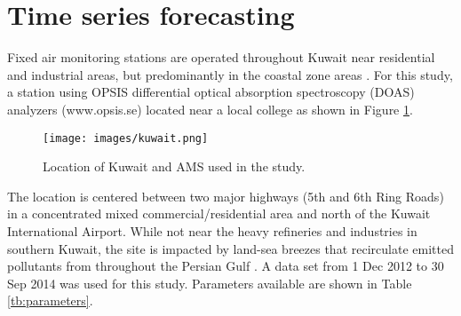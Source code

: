 \clearpage

\section{Time series forecasting}

Fixed air monitoring stations are operated throughout Kuwait near residential and industrial areas, but predominantly in the coastal zone areas \citep{Freeman2017a}. For this study, a station using OPSIS differential optical absorption spectroscopy (DOAS) analyzers (www.opsis.se) located near a local college as shown in Figure \ref{fig:Kuwait}. 
%
\begin{figure}[H]
\centering
\texttt{[image: images/kuwait.png]}
\caption{Location of Kuwait and AMS used in the study.}
\label{fig:Kuwait}
\end{figure}
%
The location is centered between two major highways (5th and 6th Ring Roads) in a concentrated mixed commercial/residential area and north of the Kuwait International Airport. While not near the heavy refineries and industries in southern Kuwait, the site is impacted by land-sea breezes that recirculate emitted pollutants from throughout the Persian Gulf \citep{Freeman2017}. A data set from 1 Dec 2012 to 30 Sep 2014 was used for this study. Parameters available are shown in Table \ref{tb:parameters}.
%

